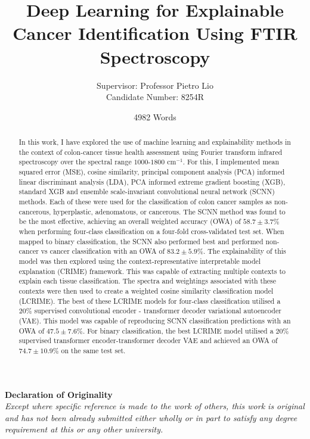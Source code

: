 \documentclass{article}
\title{Deep Learning for Explainable Cancer Identification Using FTIR Spectroscopy}
\author{Supervisor: Professor Pietro Lio \\ Candidate Number: 8254R}
\date{4982 Words}
\begin{document}
\maketitle

\begin{center}
    \textbf{Declaration of Originality} \\[1em]
    \textit{%
    Except where specific reference is made to the work of others, this work is original
    and has not been already submitted either wholly or in part to satisfy any degree
    requirement at this or any other university.
    }
\end{center}

\begin{abstract}
    \noindent
    In this work, I have explored the use of machine learning and explainability methods in the context of colon-cancer tissue health assessment using Fourier transform infrared spectroscopy over the spectral range $1000$-$1800$ cm$^{-1}$. For this, I implemented mean squared error (MSE), cosine similarity, principal component analysis (PCA) informed linear discriminant analysis (LDA), PCA informed extreme gradient boosting (XGB), standard XGB and ensemble scale-invariant convolutional neural network (SCNN) methods. Each of these were used for the classification of colon cancer samples as non-cancerous, hyperplastic, adenomatous, or cancerous. The SCNN method was found to be the most effective, achieving an overall weighted accuracy (OWA) of $58.7\pm3.7\%$ when performing four-class classification on a four-fold cross-validated test set. When mapped to binary classification, the SCNN also performed best and performed non-cancer vs cancer classification with an OWA of $83.2\pm5.9\%$. The explainability of this model was then explored using the context-representative interpretable model explanation (CRIME) framework. This was capable of extracting multiple contexts to explain each tissue classification. The spectra and weightings associated with these contexts were then used to create a weighted cosine similarity classification model (LCRIME). The best of these LCRIME models for four-class classification utilised a $20\%$ supervised convolutional encoder - transformer decoder variational autoencoder (VAE). This model was capable of reproducing SCNN classification predictions with an OWA of $47.5\pm7.6\%$. For binary classification, the best LCRIME model utilised a $20\%$ supervised transformer encoder-transformer decoder VAE and achieved an OWA of $74.7\pm 10.9\%$ on the same test set.
\end{abstract}
\end{document}
